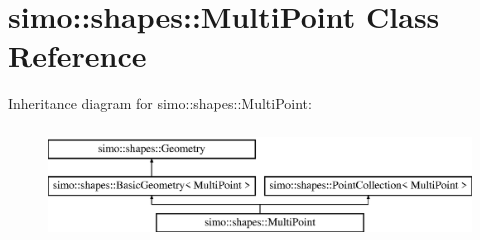 \hypertarget{classsimo_1_1shapes_1_1_multi_point}{\section{simo\-:\-:shapes\-:\-:Multi\-Point Class Reference}
\label{classsimo_1_1shapes_1_1_multi_point}
}
Inheritance diagram for simo\-:\-:shapes\-:\-:Multi\-Point\-:\begin{figure}[H]
\begin{center}
\leavevmode
\includegraphics[height=3.000000cm]{classsimo_1_1shapes_1_1_multi_point}
\end{center}
\end{figure}
